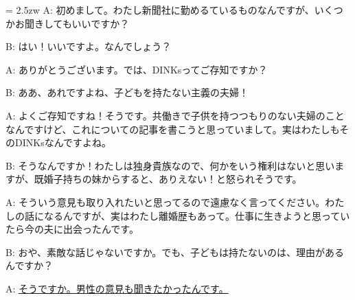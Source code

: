 \documentclass[11pt]{amsart}
\title{}
\author{}
\newenvironment{hangall}[1]{\hangindent = 2.5zw\everypar{\hangindent = 2.5zw}}{}
\begin{document}
\maketitle
\begin{hangall}{}%
A: 初めまして。わたし新聞社に勤めるているものなんですが、いくつかお聞きしてもいいですか？

B: はい！いいですよ。なんでしょう？

A: ありがとうございます。では、DINKsってご存知ですか？

B: ああ、あれですよね、子どもを持たない主義の夫婦！

A: よくご存知ですね！そうです。共働きで子供を持つつもりのない夫婦のことなんですけど、これについての記事を書こうと思っていまして。実はわたしもそのDINKsなんですよね。

B: そうなんですか！わたしは独身貴族なので、何かをいう権利はないと思いますが、既婚子持ちの妹からすると、ありえない！と怒られそうです。

A: そういう意見も取り入れたいと思ってるので遠慮なく言ってください。わたしの話になるんですが、実はわたし離婚歴もあって。仕事に生きようと思っていたら今の夫に出会ったんです。

B: おや、素敵な話じゃないですか。でも、子どもは持たないのは、理由があるんですか？

A: \ul{そうですか。男性の意見も聞きたかったんです。}\end{hangall}
\end{document}

